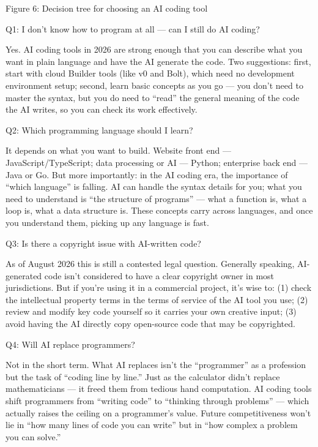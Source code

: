 \begin{center}\small\color{gray}Figure 6: Decision tree for choosing an AI coding tool\end{center}


Q1: I don't know how to program at all — can I still do AI coding?

Yes. AI coding tools in 2026 are strong enough that you can describe what you want in plain language and have the AI generate the code. Two suggestions: first, start with cloud Builder tools (like v0 and Bolt), which need no development environment setup; second, learn basic concepts as you go — you don't need to master the syntax, but you do need to “read” the general meaning of the code the AI writes, so you can check its work effectively.

Q2: Which programming language should I learn?

It depends on what you want to build. Website front end — JavaScript/TypeScript; data processing or AI — Python; enterprise back end — Java or Go. But more importantly: in the AI coding era, the importance of “which language” is falling. AI can handle the syntax details for you; what you need to understand is “the structure of programs” — what a function is, what a loop is, what a data structure is. These concepts carry across languages, and once you understand them, picking up any language is fast.

Q3: Is there a copyright issue with AI-written code?

As of August 2026 this is still a contested legal question. Generally speaking, AI-generated code isn't considered to have a clear copyright owner in most jurisdictions. But if you're using it in a commercial project, it's wise to: (1) check the intellectual property terms in the terms of service of the AI tool you use; (2) review and modify key code yourself so it carries your own creative input; (3) avoid having the AI directly copy open-source code that may be copyrighted.

Q4: Will AI replace programmers?

Not in the short term. What AI replaces isn't the “programmer” as a profession but the task of “coding line by line.” Just as the calculator didn't replace mathematicians — it freed them from tedious hand computation. AI coding tools shift programmers from “writing code” to “thinking through problems” — which actually raises the ceiling on a programmer's value. Future competitiveness won't lie in “how many lines of code you can write” but in “how complex a problem you can solve.”

